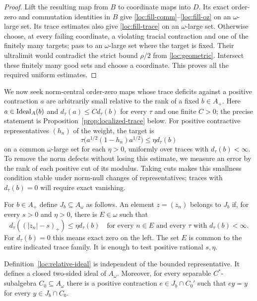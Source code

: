 \begin{proof}
Lift the resulting \cpc map from $B$ to coordinate \cpc maps into $D$.
Its exact order-zero and commutation identities in $B$ give
\eqref{loc:fill-comm}--\eqref{loc:fill-oz} on an $\omega$-large set.
Its trace estimates also give \eqref{loc:fill-trace} on an
$\omega$-large set.  Otherwise choose, at every failing coordinate, a
violating tracial contraction and one of the finitely many targets;
pass to an $\omega$-large set where the target is fixed.  Their
ultralimit would contradict the strict bound $\rho/2$ from
\eqref{loc:geometric}.  Intersect these finitely many good sets and
choose a coordinate.  This proves all the required uniform estimates.
\end{proof}

We now seek norm-central order-zero maps whose trace deficits against
a positive contraction $a$ are arbitrarily small relative to the rank
of a fixed $b\in A_+$. Here $a\in\operatorname{Ideal}_A(b)$ and
$d_\tau(a)\le C d_\tau(b)$ for every $\tau$ and one finite $C>0$; the precise
statement is Proposition~\ref{prop:localized-trace} below. For positive
contractive representatives $(h_n)$ of the weight, the target is
\[
 \tau\bigl(a^{1/2}(1-h_n)a^{1/2}\bigr)\le\eta d_\tau(b)
\]
on a common $\omega$-large set for each $\eta>0$, uniformly over traces
with $d_\tau(b)<\infty$. To remove the norm defects without losing this
estimate, we measure an error by the rank of each positive cut of its modulus.
Taking cuts makes this smallness condition stable under norm-null
changes of representatives; traces with $d_\tau(b)=0$ will require
exact vanishing.

\begin{definition}\label{loc:relative-ideal}
For $b\in A_+$ define $J_b\subseteq A_\omega$ as follows.  An element
$z=(z_n)$ belongs to $J_b$ if, for every $s>0$ and $\eta>0$, there is
$E\in\omega$ such that
\begin{equation}\label{loc:J-predicate}
 d_\tau((|z_n|-s)_+)\le\eta d_\tau(b)
 \quad\text{for every }n\in E\text{ and every }\tau
          \text{ with }d_\tau(b)<\infty.
\end{equation}
For $d_\tau(b)=0$ this means exact zero on the left.  The set $E$ is
common to the entire indicated trace family.  It is enough to test
positive rational $s,\eta$.
\end{definition}

\begin{lemma}\label{loc:sigma-ideal}
Definition~\ref{loc:relative-ideal} is independent of the bounded
representative.  It defines a closed two-sided ideal of $A_\omega$.
Moreover, for every separable $C^*$-subalgebra $C_0\subseteq A_\omega$
there is a positive contraction $e\in J_b\cap C_0'$ such that
$ey=y$ for every $y\in J_b\cap C_0$.
\end{lemma}

